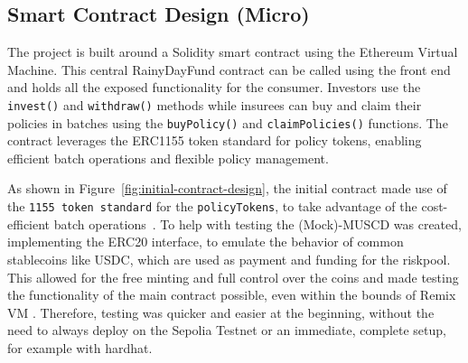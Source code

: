 \documentclass[11pt,a4paper]{article}
\begin{document}
		\subsection{Smart Contract Design (Micro)}\label{subsec:smart-contract-design}
		The project is built around a Solidity smart contract using the Ethereum Virtual Machine.
		This central RainyDayFund contract can be called using the front end and holds all the exposed functionality for the consumer.
		Investors use the \texttt{invest()} and \texttt{withdraw()} methods while insurees can buy and claim their policies in batches using the \texttt{buyPolicy()} and \texttt{claimPolicies()} functions.
		The contract leverages the ERC1155 token standard for policy tokens, enabling efficient batch operations and flexible policy management.

		As shown in Figure~\ref{fig:initial-contract-design}, the initial contract made use of the \texttt{1155 token standard} for the \texttt{policyTokens}, to take advantage of the cost-efficient batch operations~\parencite{ERC1155}.
		To help with testing the (Mock)-MUSCD was created, implementing the ERC20 interface, to emulate the behavior of common stablecoins like USDC, which are used as payment and funding for the riskpool.
		This allowed for the free minting and full control over the coins and made testing the functionality of the main contract possible, even within the bounds of Remix VM .
		Therefore, testing was quicker and easier at the beginning, without the need to always deploy on the Sepolia Testnet or an immediate, complete setup, for example with hardhat.
\end{document}
